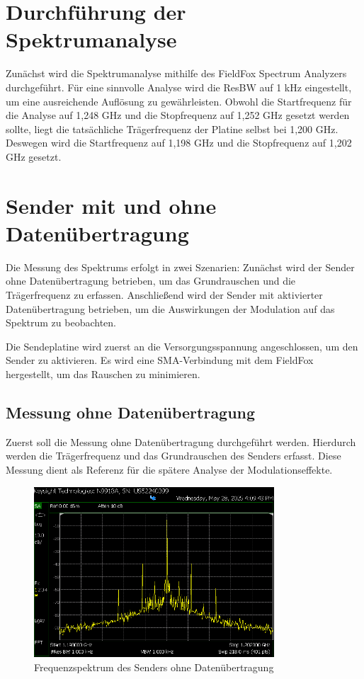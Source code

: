 \section{Durchführung der Spektrumanalyse}
Zunächst wird die Spektrumanalyse mithilfe des FieldFox Spectrum Analyzers durchgeführt. Für eine sinnvolle Analyse wird die ResBW auf 1 kHz eingestellt, um eine ausreichende Auflösung zu gewährleisten.
Obwohl die Startfrequenz für die Analyse auf 1{,}248 GHz und die Stopfrequenz auf 1{,}252 GHz gesetzt werden sollte, liegt die tatsächliche Trägerfrequenz der Platine selbst bei 1{,}200 GHz. Deswegen wird die Startfrequenz auf 1{,}198 GHz und die Stopfrequenz auf 1{,}202 GHz gesetzt.

\section{Sender mit und ohne Datenübertragung}
Die Messung des Spektrums erfolgt in zwei Szenarien: Zunächst wird der Sender ohne Datenübertragung betrieben, um das Grundrauschen und die Trägerfrequenz zu erfassen. Anschließend wird der Sender mit aktivierter Datenübertragung betrieben, um die Auswirkungen der Modulation auf das Spektrum zu beobachten.

Die Sendeplatine wird zuerst an die Versorgungsspannung angeschlossen, um den Sender zu aktivieren. Es wird eine SMA-Verbindung mit dem FieldFox hergestellt, um das Rauschen zu minimieren.

\subsection{Messung ohne Datenübertragung}
Zuerst soll die Messung ohne Datenübertragung durchgeführt werden. Hierdurch werden die Trägerfrequenz und das Grundrauschen des Senders erfasst. Diese Messung dient als Referenz für die spätere Analyse der Modulationseffekte.
\begin{figure}[H]
    \centering
    \includegraphics[width=0.8\textwidth]{Pictures/4.4.png}
    \caption{Frequenzspektrum des Senders ohne Datenübertragung}
    \label{fig:OhneDaten}
\end{figure}

